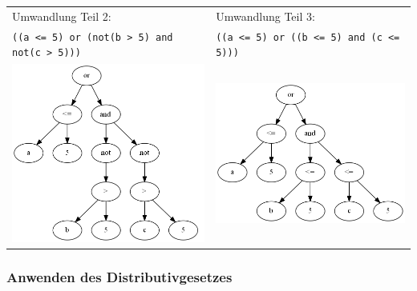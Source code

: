 \begin{tabular}{ll}
Umwandlung Teil 2: & Umwandlung Teil 3:\\
\verb|((a <= 5) or (not(b > 5) and not(c > 5)))| & \verb|((a <= 5) or ((b <= 5) and (c <= 5)))|\\
\includegraphics[scale=0.5]{Bilder/not_graph3.png} & \includegraphics[scale=0.5]{Bilder/not_graph4.png}\\
\end{tabular}


\subsubsection{Anwenden des Distributivgesetzes}

